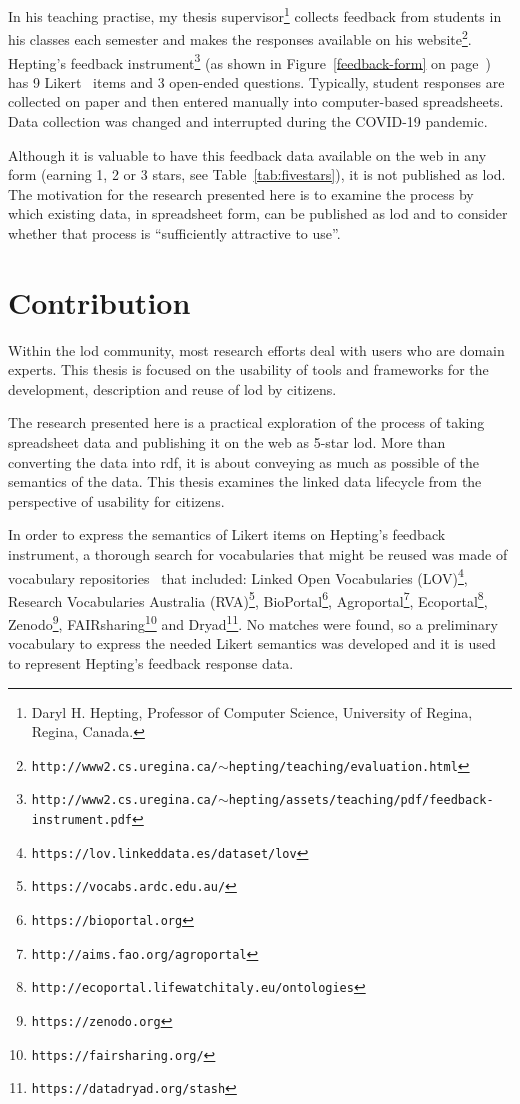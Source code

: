\begin{doublespace}
In his teaching practise, 
my thesis supervisor\footnote{Daryl H. Hepting, Professor of Computer Science, University of Regina, Regina, Canada.} collects feedback from students in his classes each semester and makes the responses available on his 
website\footnote{\tt http://www2.cs.uregina.ca/$\sim$hepting/teaching/evaluation.html}. 
Hepting's feedback 
instrument\footnote{\tt http://www2.cs.uregina.ca/$\sim$hepting/assets/teaching/pdf/feedback-instrument.pdf}
(as shown in Figure~\ref{feedback-form} on page~\pageref{feedback-form})
has 9 Likert~\cite{johns2010likert} items and 3 open-ended questions.
Typically, student responses are collected on paper 
and then entered manually into computer-based spreadsheets. 
Data collection was changed and interrupted during the COVID-19 pandemic. 

Although it is valuable to have this feedback data available on the web
in any form (earning 1, 2 or 3 stars, see Table~\ref{tab:fivestars}), 
it is not published as \ac{lod}. 
The motivation for the research presented here is to examine the process 
by which existing data, in spreadsheet form, can be published as \ac{lod} 
and to consider whether that process is ``sufficiently attractive to use''.

\section{Contribution}
\label{sec:contribution}

Within the \ac{lod} community, 
most research efforts deal with users who are domain experts.
This thesis is focused on the usability of tools and frameworks 
for the development, description and reuse 
of \ac{lod} by citizens.
 
The research presented here is a practical exploration of the process of
taking spreadsheet data and publishing it on the web as 5-star \ac{lod}.
More than converting the data into \ac{rdf}, 
it is about conveying as much as possible of the semantics of the data.
This thesis examines the linked data lifecycle from the perspective of usability
for citizens.

In order to express the semantics of Likert items on Hepting's feedback instrument, 
a thorough search for vocabularies that might be reused was made of vocabulary repositories~\cite{cox2021ten} that included:
Linked Open Vocabularies (LOV)\footnote{\tt https://lov.linkeddata.es/dataset/lov}, 
Research Vocabularies Australia (RVA)\footnote{\tt https://vocabs.ardc.edu.au/}, 
BioPortal\footnote{\tt https://bioportal.org}, 
Agroportal\footnote{\tt http://aims.fao.org/agroportal}, 
Ecoportal\footnote{\tt http://ecoportal.lifewatchitaly.eu/ontologies}, 
Zenodo\footnote{\tt https://zenodo.org}, 
FAIRsharing\footnote{\tt https://fairsharing.org/} and 
Dryad\footnote{\tt https://datadryad.org/stash}.
No matches were found, so a
preliminary vocabulary to express the needed Likert semantics was developed and
it is used to represent Hepting's feedback response data. 


\end{doublespace}
